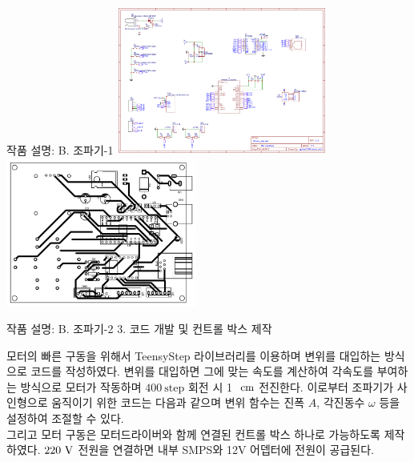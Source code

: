 \documentclass[Junlampaper, portrait]{Junlam_PosterK}
\begin{document}
\begin{poster}
\begin{posterbox}[name=circuit, column=0, below=theo]{작품 설명: B. 조파기-1}
            \includegraphics[width=0.52\textwidth]{images/Schematic_Wave_maker_2-1_2022-11-24.pdf}
            \includegraphics[width=0.47\textwidth]{images/PCB_PCB_Wave_maker copy_2022-11-24.pdf} 
            \label{circuit}
\vspace{1.0em}
\end{posterbox}

\begin{posterbox}[name=circuit,column=1,below=wtank]{작품 설명: B. 조파기-2} %
\small {3. 코드 개발 및 컨트롤 박스 제작\\}
    \scriptsize {    
     
     모터의 빠른 구동을 위해서 TeensyStep 라이브러리를 이용하며 변위를 대입하는 방식으로 코드를 작성하였다.  변위를 대입하면 그에 맞는 속도를 계산하여 각속도를 부여하는 방식으로 모터가 작동하며 $400\mathrm{~step}$ 회전 시 1 $\rm{~cm}$ 전진한다. 이로부터 조파기가 사인형으로 움직이기 위한 코드는 다음과 같으며 변위 함수는 진폭 $A$, 각진동수 $\omega$ 등을 설정하여 조절할 수 있다.\\
     그리고 모터 구동은 모터드라이버와 함께 연결된 컨트롤 박스 하나로 가능하도록 제작하였다. ${220\rm{~V}}$ 전원을 연결하면 내부 SMPS와 12V 어뎁터에 전원이 공급된다.}
      

\end{posterbox}
\end{poster}
\end{document}

